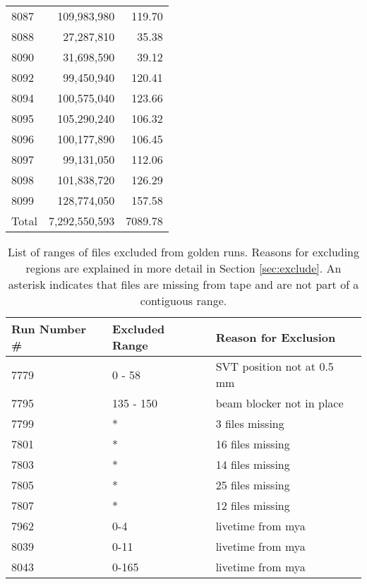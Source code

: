 \documentclass[11pt]{article}
\begin{document}
\begin{longtable}[!hbtp]{l r r}
8087  &  109,983,980  &  119.70\\
8088  &  27,287,810  &  35.38\\
8090  &  31,698,590  &  39.12\\
8092  &  99,450,940  &  120.41\\
8094  &  100,575,040  &  123.66\\
8095  &  105,290,240  &  106.32\\
8096  &  100,177,890  &  106.45\\
8097  &  99,131,050  &  112.06\\
8098  &  101,838,720  &  126.29\\
8099  &  128,774,050  &  157.58\\

\hline
Total &7,292,550,593 & 7089.78 \\
  \hline
  \hline

\end{longtable}  

\begin{table}[htp]
\caption{List of ranges of files excluded from golden runs.  Reasons for excluding regions are explained in more detail in Section \ref{sec:exclude}.  An asterisk indicates that files are missing from tape and are not part of a contiguous range.}
\begin{center}
\begin{tabular}{l l l}
Run Number \# & Excluded Range & Reason for Exclusion \\
\hline
7779 & 0 - 58  & SVT position not at 0.5 mm\\
7795 & 135 - 150 & beam blocker not in place \\
7799 & * & 3 files missing \\
7801 & * & 16 files missing \\
7803 & * & 14 files missing \\
7805 & * & 25 files missing \\
7807 & * & 12 files missing \\
7962 & 0-4 & livetime from mya \\
8039 & 0-11 & livetime from mya \\
8043 & 0-165 & livetime from mya \\

\end{tabular}
\end{center}
\label{tbl:excluded_file_ranges}
\end{table}%
\end{document}
